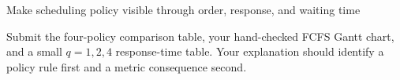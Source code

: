 \begin{labproject}{Make scheduling policy visible through order, response, and waiting time}
\begin{labdeliverable}
Submit the four-policy comparison table, your hand-checked FCFS Gantt chart, and a small $q=1,2,4$ response-time table. Your explanation should identify a policy rule first and a metric consequence second.
\end{labdeliverable}
\end{labproject}
